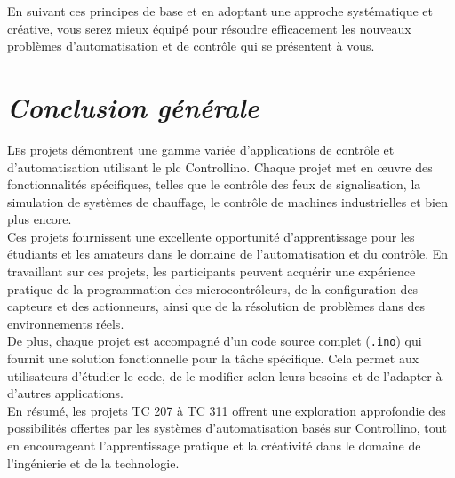 \documentclass[a4paper,12pt]{report}
\begin{document}
En suivant ces principes de base et en adoptant une approche systématique et créative, vous serez mieux équipé pour résoudre efficacement les nouveaux problèmes d'automatisation et de contrôle qui se présentent à vous.

\chapter*{\textbf{\textit{Conclusion générale}}}
\lettrine{L}es projets  démontrent une gamme variée d'applications de contrôle et d'automatisation utilisant le plc Controllino. Chaque projet met en œuvre des fonctionnalités spécifiques, telles que le contrôle des feux de signalisation, la simulation de systèmes de chauffage, le contrôle de machines industrielles et bien plus encore.\\

Ces projets fournissent une excellente opportunité d'apprentissage pour les étudiants et les amateurs dans le domaine de l'automatisation et du contrôle. En travaillant sur ces projets, les participants peuvent acquérir une expérience pratique de la programmation des microcontrôleurs, de la configuration des capteurs et des actionneurs, ainsi que de la résolution de problèmes dans des environnements réels.\\

De plus, chaque projet est accompagné d'un code source complet (\texttt{.ino}) qui fournit une solution fonctionnelle pour la tâche spécifique. Cela permet aux utilisateurs d'étudier le code, de le modifier selon leurs besoins et de l'adapter à d'autres applications.\\

En résumé, les projets TC 207 à TC 311 offrent une exploration approfondie des possibilités offertes par les systèmes d'automatisation basés sur Controllino, tout en encourageant l'apprentissage pratique et la créativité dans le domaine de l'ingénierie et de la technologie.
\newpage
\begin{thebibliography}{9}

\end{thebibliography}
\end{document}
